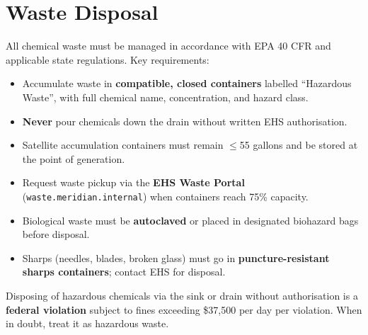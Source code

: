 \section{Waste Disposal}

All chemical waste must be managed in accordance with EPA 40 CFR and applicable state
regulations. Key requirements:

\begin{itemize}[noitemsep, topsep=2pt, leftmargin=1.4em]
  \item Accumulate waste in \textbf{compatible, closed containers} labelled ``Hazardous Waste'',
    with full chemical name, concentration, and hazard class.
  \item \textbf{Never} pour chemicals down the drain without written EHS authorisation.
  \item Satellite accumulation containers must remain $\leq$55 gallons and be stored at the point of generation.
  \item Request waste pickup via the \textbf{EHS Waste Portal} (\texttt{waste.meridian.internal}) when containers reach 75\% capacity.
  \item Biological waste must be \textbf{autoclaved} or placed in designated biohazard bags before disposal.
  \item Sharps (needles, blades, broken glass) must go in \textbf{puncture-resistant sharps containers}; contact EHS for disposal.
\end{itemize}

\begin{warnbox}[title={\faExclamationTriangle\enskip WARNING --- Drain Disposal}]
  Disposing of hazardous chemicals via the sink or drain without authorisation is a
  \textbf{federal violation} subject to fines exceeding \$37{,}500 per day per violation.
  When in doubt, treat it as hazardous waste.
\end{warnbox}

